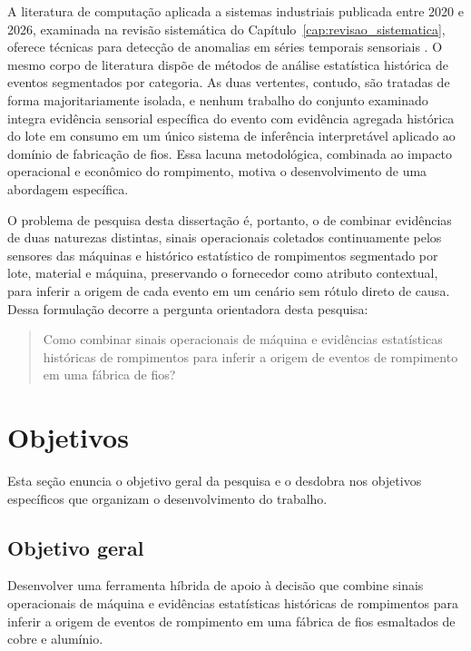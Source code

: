 A literatura de computação aplicada a sistemas industriais publicada entre 2020 e 2026, examinada na revisão sistemática do Capítulo~\ref{cap:revisao_sistematica}, oferece técnicas para detecção de anomalias em séries temporais sensoriais \cite{chandola2009anomaly,lorenti2022cuadmo,islam2026explainable}. O mesmo corpo de literatura dispõe de métodos de análise estatística histórica de eventos segmentados por categoria. As duas vertentes, contudo, são tratadas de forma majoritariamente isolada, e nenhum trabalho do conjunto examinado integra evidência sensorial específica do evento com evidência agregada histórica do lote em consumo em um único sistema de inferência interpretável aplicado ao domínio de fabricação de fios. Essa lacuna metodológica, combinada ao impacto operacional e econômico do rompimento, motiva o desenvolvimento de uma abordagem específica.

O problema de pesquisa desta dissertação é, portanto, o de combinar evidências de duas naturezas distintas, sinais operacionais coletados continuamente pelos sensores das máquinas e histórico estatístico de rompimentos segmentado por lote, material e máquina, preservando o fornecedor como atributo contextual, para inferir a origem de cada evento em um cenário sem rótulo direto de causa. Dessa formulação decorre a pergunta orientadora desta pesquisa:
\begin{quote}
Como combinar sinais operacionais de máquina e evidências estatísticas históricas de rompimentos para inferir a origem de eventos de rompimento em uma fábrica de fios?
\end{quote}


\section{Objetivos}
\label{sec:objetivos}

Esta seção enuncia o objetivo geral da pesquisa e o desdobra nos objetivos específicos que organizam o desenvolvimento do trabalho.

\subsection{Objetivo geral}
\label{subsec:objetivo_geral}

Desenvolver uma ferramenta híbrida de apoio à decisão que combine sinais operacionais de máquina e evidências estatísticas históricas de rompimentos para inferir a origem de eventos de rompimento em uma fábrica de fios esmaltados de cobre e alumínio.


